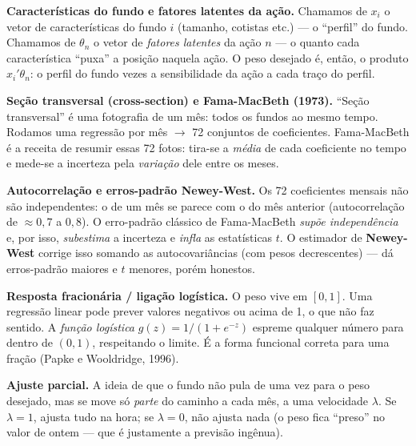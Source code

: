 \documentclass[11pt,a4paper]{article}
\begin{document}
\begin{conceito}
\textbf{Características do fundo e fatores latentes da ação.} Chamamos de $x_i$ o vetor de
características do fundo $i$ (tamanho, cotistas etc.) --- o ``perfil'' do fundo. Chamamos de
$\theta_n$ o vetor de \emph{fatores latentes} da ação $n$ --- o quanto cada característica
``puxa'' a posição naquela ação. O peso desejado é, então, o produto $x_i'\theta_n$: o perfil do
fundo vezes a sensibilidade da ação a cada traço do perfil.
\end{conceito}

\begin{conceito}
\textbf{Seção transversal (cross-section) e Fama-MacBeth (1973).} ``Seção transversal'' é uma
fotografia de um mês: todos os fundos ao mesmo tempo. Rodamos uma regressão por mês $\to$ 72
conjuntos de coeficientes. Fama-MacBeth é a receita de resumir essas 72 fotos: tira-se a
\emph{média} de cada coeficiente no tempo e mede-se a incerteza pela \emph{variação} dele entre
os meses.
\end{conceito}

\begin{conceito}
\textbf{Autocorrelação e erros-padrão Newey-West.} Os 72 coeficientes mensais não são
independentes: o de um mês se parece com o do mês anterior (autocorrelação de $\approx0{,}7$ a
$0{,}8$). O erro-padrão clássico de Fama-MacBeth \emph{supõe independência} e, por isso,
\emph{subestima} a incerteza e \emph{infla} as estatísticas $t$. O estimador de \textbf{Newey-West}
corrige isso somando as autocovariâncias (com pesos decrescentes) --- dá erros-padrão maiores e
$t$ menores, porém honestos.
\end{conceito}

\begin{conceito}
\textbf{Resposta fracionária / ligação logística.} O peso vive em $[0,1]$. Uma regressão linear
pode prever valores negativos ou acima de 1, o que não faz sentido. A \emph{função logística}
$g(z)=1/(1+e^{-z})$ espreme qualquer número para dentro de $(0,1)$, respeitando o limite. É a
forma funcional correta para uma fração (Papke e Wooldridge, 1996).
\end{conceito}

\begin{conceito}
\textbf{Ajuste parcial.} A ideia de que o fundo não pula de uma vez para o peso desejado, mas se
move só \emph{parte} do caminho a cada mês, a uma velocidade $\lambda$. Se $\lambda=1$, ajusta
tudo na hora; se $\lambda=0$, não ajusta nada (o peso fica ``preso'' no valor de ontem --- que é
justamente a previsão ingênua).
\end{conceito}
\end{document}
